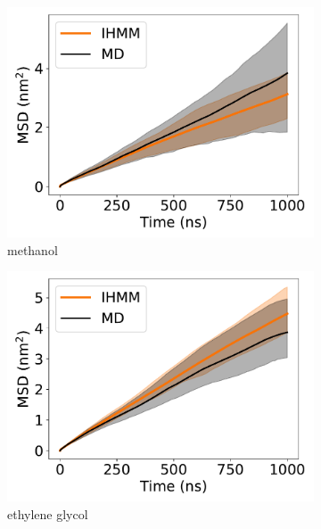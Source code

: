 \documentclass[journal=jpcbfk,manuscript=article]{achemso}
\begin{document}
  \begin{figure}
  \centering
  \begin{subfigure}{0.24\textwidth}
  \includegraphics[width=\textwidth]{unclustered_msd_MET.pdf}
  \caption{methanol}\label{fig:unclustered_msd_MET}
  \end{subfigure}
  \begin{subfigure}{0.24\textwidth}
  \includegraphics[width=\textwidth]{unclustered_msd_GCL.pdf}
  \caption{ethylene glycol}\label{fig:unclustered_msd_GCL}
  \end{subfigure}
  \begin{subfigure}{0.24\textwidth}

\end{subfigure}
\end{figure}
\end{document}
